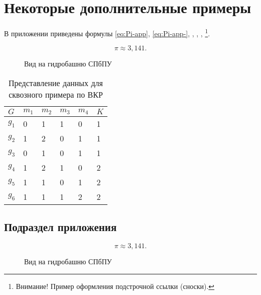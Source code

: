\chapter{Некоторые дополнительные примеры}\label{appendix-extra-examples}							%

В приложении приведены формулы \eqref{eq:Pi-app}, \eqref{eq:Pi-app-}, , , , \footnote{Внимание! Пример оформления подстрочной ссылки (сноски).}.


\begin{equation}%
\label{eq:Pi-app-} %
\pi \approx 3,141.
\end{equation}
%
%
\begin{figure}[ht!]
	\center
	\caption{Вид на гидробашню СПбПУ \cite{spbpu-gallery}}
	\label{fig:spbpu_hydrotower-app-}
\end{figure}

\begin{table} [htbp]%
	\centering\small
	\caption{Представление данных для сквозного примера по ВКР \cite{Peskov2004}}%
	\label{tab:ToyCompare-app-}
	\begin{tabular}{|l|l|l|l|l|l|}
		\hline
		$G$&$m_1$&$m_2$&$m_3$&$m_4$&$K$\\
		\hline
		$g_1$&0&1&1&0&1\\ \hline
		$g_2$&1&2&0&1&1\\ \hline
		$g_3$&0&1&0&1&1\\ \hline
		$g_4$&1&2&1&0&2\\ \hline
		$g_5$&1&1&0&1&2\\ \hline
		$g_6$&1&1&1&2&2\\ \hline
	\end{tabular}
	\normalsize%
\end{table}




\section{Подраздел приложения}\label{app-2-1}


\begin{equation}%
\label{eq:Pi-app} %
\pi \approx 3,141.
\end{equation}
%
%
\begin{figure}[ht!]
	\center
	\caption{Вид на гидробашню СПбПУ \cite{spbpu-gallery}}
	\label{fig:spbpu_hydrotower-app}
\end{figure}

